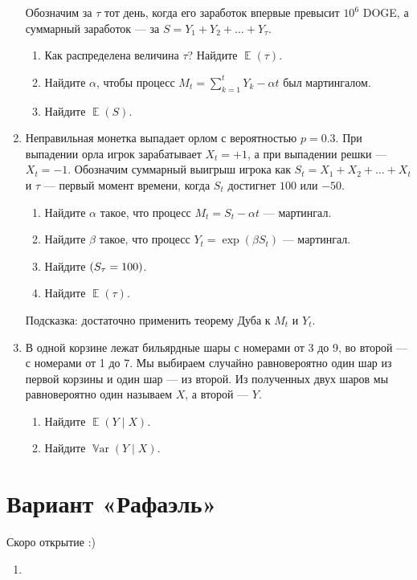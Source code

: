 \documentclass[12pt]{article}
\DeclareMathOperator{\Var}{\mathbb{V}ar}
\let\P\relax
\DeclareMathOperator{\P}{\mathbb{P}}
\DeclareMathOperator{\E}{\mathbb{E}}
\begin{document}
\begin{enumerate}
    Обозначим за $\tau$ тот день, когда его заработок впервые превысит $10^6$ DOGE,
    а суммарный заработок — за  $S = Y_1 + Y_2 + \dots + Y_\tau$.
    \begin{enumerate}
        \item Как распределена величина $\tau$? Найдите $\E(\tau)$.
        \item Найдите $\alpha$, чтобы процесс $M_t = \sum_{k=1}^t Y_k - \alpha t$ был мартингалом.
        \item Найдите $\E(S)$.
    \end{enumerate}
    
    \item Неправильная монетка выпадает орлом с вероятностью $p = 0.3$. 
    При выпадении орла игрок зарабатывает $X_t = +1$, а при выпадении решки — $X_t = -1$.
    Обозначим суммарный выигрыш игрока как $S_t = X_1 + X_2 + \dots + X_t$ и $\tau$ — первый момент времени, когда $S_t$ достигнет $100$ или $-50$.

    \begin{enumerate}
        \item Найдите $\alpha$ такое, что процесс $M_t = S_t - \alpha t$ — мартингал. 
        \item Найдите $\beta$ такое, что процесс $Y_t = \exp(\beta S_t)$ — мартингал. 
        \item Найдите $\P(S_\tau = 100)$.
        \item Найдите $\E(\tau)$.
    \end{enumerate}

    Подсказка: достаточно применить теорему Дуба к $M_t$ и $Y_t$.

    \item В одной корзине лежат бильярдные шары с номерами от 3 до 9, во второй — с номерами от 1 до 7. 
    Мы выбираем случайно равновероятно один шар из первой корзины и один шар — из второй. 
    Из полученных двух шаров мы равновероятно один называем $X$, а второй — $Y$.
    \begin{enumerate}
        \item Найдите $\E(Y \mid X)$.
        \item Найдите $\Var(Y \mid X)$.
    \end{enumerate}
    

\end{enumerate}


\section*{Вариант «Рафаэль»}

Скоро открытие :)

\begin{enumerate}
\item 
\end{enumerate}
\end{document}
